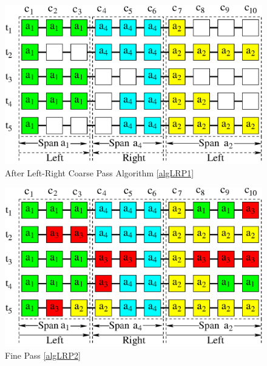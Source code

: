 \documentclass[10pt, conference]{IEEEtran}
\begin{document}
\begin{figure}[tb]
\centering 
\includegraphics[scale=0.5]{./figure/left_right.eps}
\vspace{0.0cm}\caption{After Left-Right Coarse Pass Algorithm \ref{algLRP1}}
\vspace{-0.1cm}
\label{figLRP1}
\end{figure}


\begin{figure}[tb]
\centering 
\includegraphics[scale=0.5]{./figure/left_right_fine.eps}
\vspace{0.0cm}\caption{Fine Pass \ref{algLRP2}}
\vspace{-0.1cm}
\label{figLRP2}
\end{figure}
\end{document}

